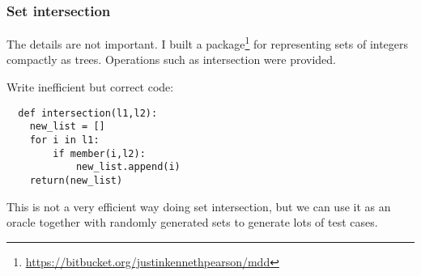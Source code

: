 \documentclass{beamer}
\begin{document}
\begin{frame}[fragile]
  \frametitle{Set intersection}

The details are not important.  I built a
package\footnote{\url{https://bitbucket.org/justinkennethpearson/mdd}} for
representing sets of integers compactly as trees. Operations such as
intersection were provided.

Write inefficient but correct code:
\begin{lstlisting}
  def intersection(l1,l2):
    new_list = []
    for i in l1:
        if member(i,l2):
            new_list.append(i)
    return(new_list)
\end{lstlisting}

This is not a very efficient way doing set intersection, but we can use it as
an oracle together with randomly generated sets to generate lots of test
cases. 
\end{frame}
\end{document}
